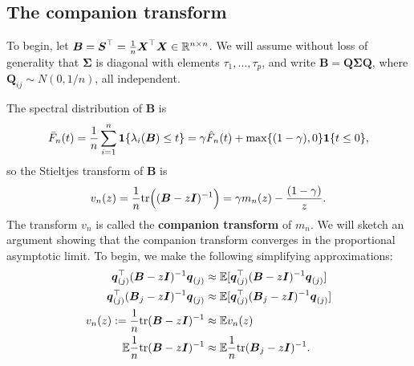 \documentclass{article}
\newcommand{\bq}{\boldsymbol{q}}
\newcommand{\bX}{\boldsymbol{X}}
\newcommand{\bSigma}{\boldsymbol{\Sigma}}
\newcommand{\bS}{\boldsymbol{S}}
\newcommand{\bB}{\boldsymbol{B}}
\newcommand{\bQ}{\boldsymbol{Q}}
\newcommand{\bI}{\boldsymbol{I}}
\begin{document}
\subsection{The companion transform}
To begin, let $\bB = \bS^{\top} = \frac{1}{n} \bX^{\top} \bX \in \Reals^{n \times n}$. We will assume without loss of generality that $\bSigma$ is diagonal with elements $\tau_1,\ldots,\tau_p$, and write $\bB = \bQ \bSigma \bQ$, where $\bQ_{ij} \sim N(0,1/n)$, all independent. 

The spectral distribution of $\bB$ is 
$$
\bar{F}_n(t) = \frac{1}{n}\sum_{i = 1}^{n} \1\{\lambda_i(\bB) \leq t\} = \gamma \hat{F}_n(t) + \max\{(1 - \gamma),0\} \1\{t \leq 0\},
$$
so the Stieltjes transform of $\bB$ is 
$$
v_n(z) = \frac{1}{n} \tr\Big((\bB - z\bI)^{-1}\Big) = \gamma m_n(z) - \frac{(1 - \gamma)}{z}.
$$
The transform $v_n$ is called the {\bf companion transform} of $m_n$. We will sketch an argument showing that the companion transform converges in the proportional asymptotic limit. To begin, we make the following simplifying approximations:
\begin{align*}
	\bq_{(j)}^{\top} (\bB - z\bI)^{-1} \bq_{(j)} & \approx \mathbb{E}[\bq_{(j)}^{\top} (\bB - z\bI)^{-1} \bq_{(j)}] \\
	\bq_{(j)}^{\top} (\bB_j - z\bI)^{-1} \bq_{(j)} & \approx \mathbb{E}[\bq_{(j)}^{\top} (\bB_j - z\bI)^{-1} \bq_{(j)}] \\
	v_n(z) := \frac{1}{n}\tr(\bB - z \bI)^{-1} & \approx \mathbb{E} v_n(z) \\
	\mathbb{E}{\frac{1}{n}\tr(\bB - z \bI)^{-1}} & \approx \mathbb{E}{\frac{1}{n}\tr(\bB_j - z \bI)^{-1}}.
\end{align*}
\end{document}
